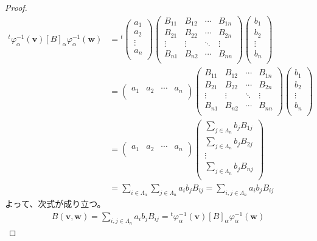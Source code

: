 \documentclass[dvipdfmx]{jsarticle}
\begin{document}
\begin{proof}
\begin{align*}
{}^{t}\varphi_{\alpha}^{- 1}\left( \mathbf{v} \right)[ B]_{\alpha}\varphi_{\alpha}^{- 1}\left( \mathbf{w} \right) &={}^{t}\begin{pmatrix}
a_{1} \\
a_{2} \\
 \vdots \\
a_{n} \\
\end{pmatrix}\begin{pmatrix}
B_{11} & B_{12} & \cdots & B_{1n} \\
B_{21} & B_{22} & \cdots & B_{2n} \\
 \vdots & \vdots & \ddots & \vdots \\
B_{n1} & B_{n2} & \cdots & B_{nn} \\
\end{pmatrix}\begin{pmatrix}
b_{1} \\
b_{2} \\
 \vdots \\
b_{n} \\
\end{pmatrix}\\
&= \begin{pmatrix}
a_{1} & a_{2} & \cdots & a_{n} \\
\end{pmatrix}\begin{pmatrix}
B_{11} & B_{12} & \cdots & B_{1n} \\
B_{21} & B_{22} & \cdots & B_{2n} \\
 \vdots & \vdots & \ddots & \vdots \\
B_{n1} & B_{n2} & \cdots & B_{nn} \\
\end{pmatrix}\begin{pmatrix}
b_{1} \\
b_{2} \\
 \vdots \\
b_{n} \\
\end{pmatrix}\\
&= \begin{pmatrix}
a_{1} & a_{2} & \cdots & a_{n} \\
\end{pmatrix}\begin{pmatrix}
\sum_{j \in \varLambda_{n}} {b_{j}B_{1j}} \\
\sum_{j \in \varLambda_{n}} {b_{j}B_{2j}} \\
 \vdots \\
\sum_{j \in \varLambda_{n}} {b_{j}B_{nj}} \\
\end{pmatrix}\\
&= \sum_{i \in \varLambda_{n}} {\sum_{j \in \varLambda_{n}} {a_{i}b_{j}B_{ij}}} = \sum_{i,j \in \varLambda_{n}} {a_{i}b_{j}B_{ij}}
\end{align*}
よって、次式が成り立つ。
\begin{align*}
B\left( \mathbf{v},\mathbf{w} \right) = \sum_{i,j \in \varLambda_{n}} {a_{i}b_{j}B_{ij}} ={}^{t}\varphi_{\alpha}^{- 1}\left( \mathbf{v} \right)[ B]_{\alpha}\varphi_{\alpha}^{- 1}\left( \mathbf{w} \right)
\end{align*}
\end{proof}
\end{document}
